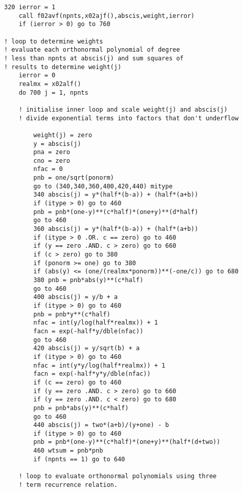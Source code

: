\documentclass[12pt]{article}
\begin{document}
\begin{lstlisting}[frame=single,caption={{\tt d01b.f90}},label=d01b]
    320 ierror = 1
    call f02avf(npnts,x02ajf(),abscis,weight,ierror)
    if (ierror > 0) go to 760

! loop to determine weights
! evaluate each orthonormal polynomial of degree
! less than npnts at abscis(j) and sum squares of
! results to determine weight(j)
    ierror = 0
    realmx = x02alf()
    do 700 j = 1, npnts
    
    ! initialise inner loop and scale weight(j) and abscis(j)
    ! divide exponential terms into factors that don't underflow
    
        weight(j) = zero
        y = abscis(j)
        pna = zero
        cno = zero
        nfac = 0
        pnb = one/sqrt(ponorm)
        go to (340,340,360,400,420,440) mitype
        340 abscis(j) = y*(half*(b-a)) + (half*(a+b))
        if (itype > 0) go to 460
        pnb = pnb*(one-y)**(c*half)*(one+y)**(d*half)
        go to 460
        360 abscis(j) = y*(half*(b-a)) + (half*(a+b))
        if (itype > 0 .OR. c == zero) go to 460
        if (y == zero .AND. c > zero) go to 660
        if (c > zero) go to 380
        if (ponorm >= one) go to 380
        if (abs(y) <= (one/(realmx*ponorm))**(-one/c)) go to 680
        380 pnb = pnb*abs(y)**(c*half)
        go to 460
        400 abscis(j) = y/b + a
        if (itype > 0) go to 460
        pnb = pnb*y**(c*half)
        nfac = int(y/log(half*realmx)) + 1
        facn = exp(-half*y/dble(nfac))
        go to 460
        420 abscis(j) = y/sqrt(b) + a
        if (itype > 0) go to 460
        nfac = int(y*y/log(half*realmx)) + 1
        facn = exp(-half*y*y/dble(nfac))
        if (c == zero) go to 460
        if (y == zero .AND. c > zero) go to 660
        if (y == zero .AND. c < zero) go to 680
        pnb = pnb*abs(y)**(c*half)
        go to 460
        440 abscis(j) = two*(a+b)/(y+one) - b
        if (itype > 0) go to 460
        pnb = pnb*(one-y)**(c*half)*(one+y)**(half*(d+two))
        460 wtsum = pnb*pnb
        if (npnts == 1) go to 640
    
    ! loop to evaluate orthonormal polynomials using three
    ! term recurrence relation.
    

\end{lstlisting}
\end{document}
